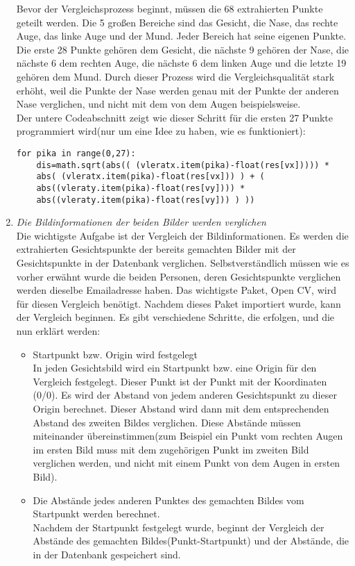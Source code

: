 \begin{enumerate}
	Bevor der Vergleichsprozess beginnt, müssen die 68 extrahierten Punkte geteilt werden. Die 5 großen Bereiche sind das Gesicht, die Nase, das rechte Auge, das linke Auge und der Mund. Jeder Bereich hat seine eigenen Punkte. Die erste 28 Punkte gehören dem Gesicht, die nächste 9 gehören der Nase, die nächste 6 dem rechten Auge, die nächste 6 dem linken Auge und die letzte 19 gehören dem Mund. Durch dieser Prozess wird die Vergleichsqualität stark erhöht, weil die Punkte der Nase werden genau mit der Punkte der anderen Nase verglichen, und nicht mit dem von dem Augen beispielsweise. \\
	Der untere Codeabschnitt zeigt wie dieser Schritt für die ersten 27 Punkte programmiert wird(nur um eine Idee zu haben, wie es funktioniert):\\
	
\begin{lstlisting}
for pika in range(0,27):
	dis=math.sqrt(abs(( (vleratx.item(pika)-float(res[vx])))) * 
	abs( (vleratx.item(pika)-float(res[vx])) ) + ( 
	abs((vleraty.item(pika)-float(res[vy]))) *
	abs((vleraty.item(pika)-float(res[vy])) ) ))
\end{lstlisting}
	\item \textit{Die Bildinformationen der beiden Bilder werden verglichen} \\
	
Die wichtigste Aufgabe ist der Vergleich der Bildinformationen. Es werden die extrahierten Gesichtspunkte der bereits gemachten Bilder mit der Gesichtspunkte in der Datenbank verglichen. Selbstverständlich müssen wie es vorher erwähnt wurde die beiden Personen, deren Gesichtspunkte verglichen werden dieselbe Emailadresse haben. Das wichtigste Paket, Open CV, wird für diesen Vergleich ben{\"o}tigt. Nachdem dieses Paket importiert wurde, kann der Vergleich beginnen. Es gibt verschiedene Schritte, die erfolgen, und die nun erklärt werden:
\begin{itemize}
	\item Startpunkt bzw. Origin wird festgelegt \\
	
	In jeden Gesichtsbild wird ein Startpunkt bzw. eine Origin für den Vergleich festgelegt. Dieser Punkt ist der Punkt mit der Koordinaten (0/0). Es wird der Abstand von jedem anderen Gesichtspunkt zu dieser Origin berechnet. Dieser Abstand wird dann mit dem entsprechenden Abstand des zweiten Bildes verglichen. Diese Abstände müssen miteinander übereinstimmen(zum Beispiel ein Punkt vom rechten Augen im ersten Bild muss mit dem zugehörigen Punkt im zweiten Bild verglichen werden, und nicht mit einem Punkt von dem Augen in ersten Bild).
	\item Die Abstände jedes anderen Punktes des gemachten Bildes vom Startpunkt werden berechnet. \\
	Nachdem der Startpunkt festgelegt wurde, beginnt der Vergleich der Abstände des gemachten Bildes(Punkt-Startpunkt) und der Abstände, die in der Datenbank gespeichert sind.
	

\end{itemize}
\end{enumerate}
